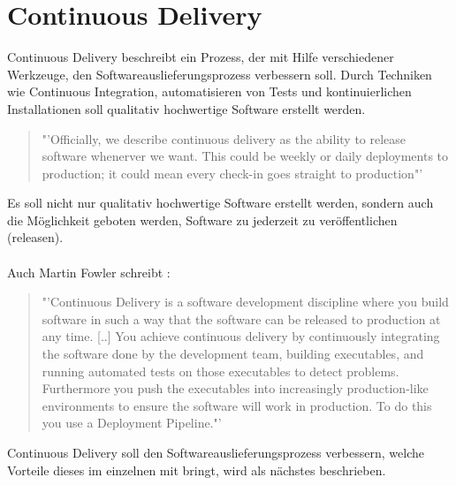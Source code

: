 \chapter{Continuous Delivery}
\label{chap:continuousDelivery}
Continuous Delivery beschreibt ein Prozess, der mit Hilfe verschiedener Werkzeuge, den Softwareauslieferungsprozess verbessern soll. Durch Techniken wie Continuous Integration, automatisieren von Tests und kontinuierlichen Installationen soll qualitativ hochwertige Software erstellt werden.

\begin{quote}\noindent
"'Officially, we describe continuous delivery as the ability to release software whenerver we want. This could be weekly or daily deployments to production; it could mean every check-in goes straight to production"'\cite{RallySofware2013}
\end{quote}
Es soll nicht nur qualitativ hochwertige Software erstellt werden, sondern auch die Möglichkeit geboten werden, Software zu jederzeit zu veröffentlichen (releasen).
\\\\
Auch Martin Fowler schreibt \cite{Fowler:CD}:

\begin{quote}
"'Continuous Delivery is a software development discipline where you build software in such a way that the software can be released to production at any time. [..] You achieve continuous delivery by continuously integrating the software done by the development team, building executables, and running automated tests on those executables to detect problems. Furthermore you push the executables into increasingly production-like environments to ensure the software will work in production. To do this you use a Deployment Pipeline."' 
\end{quote}\noindent
Continuous Delivery soll den Softwareauslieferungsprozess verbessern, welche Vorteile dieses im einzelnen mit bringt, wird als nächstes beschrieben.

